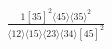 \documentclass[varwidth, border=5pt]{standalone}
\begin{document}
\begin{my}
$\begin{gathered}
\scriptscriptstyle\frac{1[35]^2⟨45⟩⟨35⟩^2}{⟨12⟩⟨15⟩⟨23⟩⟨34⟩[45]^2}
\end{gathered}$
\end{my}
\end{document}
